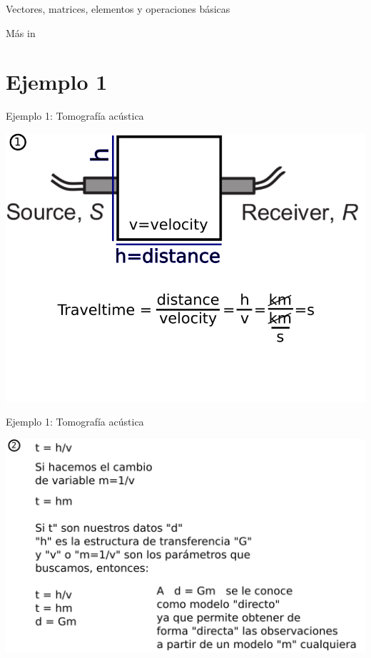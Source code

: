 \documentclass[aspectratio=169]{beamer}
\begin{document}
\begin{frame}
 {Vectores, matrices, elementos y operaciones b\'asicas}

 \begin{center}
  \Large M\'as in \cite{Menke_2018_GEO}
 \end{center}
 
\end{frame}

\section{Ejemplo 1}

\begin{frame}
 {Ejemplo 1: Tomografía acústica}
 
 \begin{center}
 \includegraphics[width=0.8\linewidth]{images/tomografia_1.png}
 \end{center}

\end{frame}


\begin{frame}
 {Ejemplo 1: Tomografía acústica}
 
 \begin{center}
 \includegraphics[width=0.8\linewidth]{images/tomografia_2.png}
 \end{center}

\end{frame}
\end{document}
